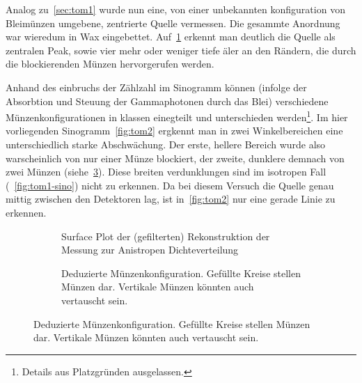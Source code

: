 \documentclass[slug=PET, room=Andreas-Schubert-Bau\,\ 424A, supervisor=Carsten\ Bittrich, coursedate=10.\ 01.\ 2020]{../../Lab_Report_LaTeX/lab_report}
\begin{document}
Analog zu~\ref{sec:tom1} wurde nun eine, von einer unbekannten
konfiguration von Bleim\"unzen umgebene, zentrierte Quelle
vermessen. Die gesammte Anordnung war wieredum in Wax eingebettet.
Auf~\ref{fig:tom2-3dplot} erkennt man deutlich die Quelle als
zentralen Peak, sowie vier mehr oder weniger tiefe \"aler an den
R\"andern, die durch die blockierenden M\"unzen hervorgerufen werden.

Anhand des einbruchs der Z\"ahlzahl im Sinogramm k\"onnen (infolge der
Absorbtion und Steuung der Gammaphotonen durch das Blei) verschiedene
M\"unzenkonfigurationen in klassen einegteilt und unterschieden
werden\footnote{Details aus Platzgr\"unden ausgelassen.}. Im hier
vorliegenden Sinogramm~\ref{fig:tom2} ergkennt man in zwei
Winkelbereichen eine unterschiedlich starke Abschw\"achung. Der erste,
hellere Bereich wurde also warscheinlich von nur einer M\"unze
blockiert, der zweite, dunklere demnach von zwei M\"unzen
(siehe~\ref{fig:munzen}). Diese breiten verdunklungen sind im
isotropen Fall (~\ref{fig:tom1-sino}) nicht zu erkennen. Da bei diesem
Versuch die Quelle genau mittig zwischen den Detektoren lag, ist
in~\ref{fig:tom2} nur eine gerade Linie zu erkennen.
\begin{figure}[h]
  \centering
  \begin{subfigure}{.4\textwidth}
    \centering
    \resizebox{0.8\textwidth}{!}{
      
    }
    \caption{Surface Plot der (gefilterten) Rekonstruktion der Messung zur Anistropen Dichteverteilung}
    \label{fig:tom2-3dplot}
  \end{subfigure}
  \begin{subfigure}{.4\textwidth}
    \centering

    \caption[M\"unzkonfiguration]{Deduzierte
      M\"unzenkonfiguration. Gef\"ullte Kreise stellen M\"unzen
      dar. Vertikale M\"unzen k\"onnten auch vertauscht sein.}
    \label{fig:munzen}
  \end{subfigure}
\end{figure}
\end{document}
